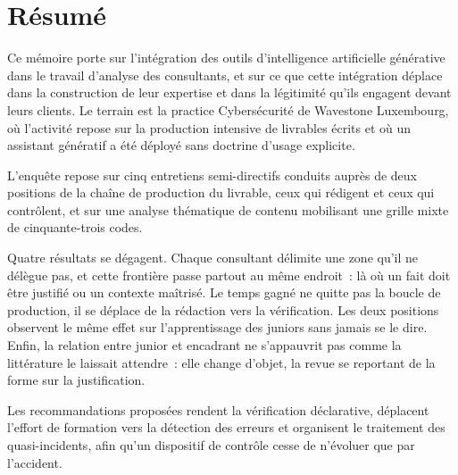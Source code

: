 \documentclass{tnreport}
\begin{document}
\begingroup
\renewcommand{\contentsname}{Table des matières détaillée}
\tableofcontents
\endgroup
\cleardoublepage{}

\thispagestyle{empty}

\section*{Résumé}

Ce mémoire porte sur l'intégration des outils d'intelligence artificielle générative dans
le travail d'analyse des consultants, et sur ce que cette intégration déplace dans la
construction de leur expertise et dans la légitimité qu'ils engagent devant leurs clients.
Le terrain est la practice Cybersécurité de Wavestone Luxembourg, où l'activité repose sur
la production intensive de livrables écrits et où un assistant génératif a été déployé sans
doctrine d'usage explicite.
 
L'enquête repose sur cinq entretiens semi-directifs conduits auprès de deux positions de la
chaîne de production du livrable, ceux qui rédigent et ceux qui contrôlent, et sur une analyse thématique de contenu mobilisant une grille mixte de cinquante-trois codes.
 
Quatre résultats se dégagent. Chaque consultant délimite une zone qu'il ne délègue pas, et
cette frontière passe partout au même endroit~: là où un fait doit être justifié ou un
contexte maîtrisé. Le temps gagné ne quitte pas la boucle de production, il se déplace de la
rédaction vers la vérification. Les deux positions observent le même effet sur l'apprentissage
des juniors sans jamais se le dire. Enfin, la relation entre junior et encadrant ne
s'appauvrit pas comme la littérature le laissait attendre~: elle change d'objet, la revue se
reportant de la forme sur la justification.
 
Les recommandations proposées rendent la vérification déclarative, déplacent l'effort de
formation vers la détection des erreurs et organisent le traitement des quasi-incidents,
afin qu'un dispositif de contrôle cesse de n'évoluer que par l'accident.
\end{document}
